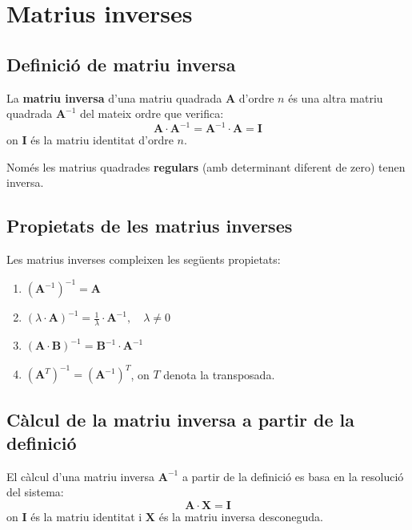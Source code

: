 \documentclass[12pt]{article}
\newcommand{\mat}[1]{\mathbf{#1}}
\begin{document}
\newpage

\section{Matrius inverses}

\subsection{Definició de matriu inversa}
\begin{concept}
La \textbf{matriu inversa} d'una matriu quadrada $\mat{A}$ d'ordre $n$ és una altra matriu quadrada $\mat{A}^{-1}$ del mateix ordre que verifica:
\[
\mat{A} \cdot \mat{A}^{-1} = \mat{A}^{-1} \cdot \mat{A} = \mat{I}
\]
on $\mat{I}$ és la matriu identitat d'ordre $n$.

Només les matrius quadrades \textbf{regulars} (amb determinant diferent de zero) tenen inversa.
\end{concept}

\subsection{Propietats de les matrius inverses}
\begin{concept}
Les matrius inverses compleixen les següents propietats:
\begin{enumerate}
    \item $(\mat{A}^{-1})^{-1} = \mat{A}$
    \item $(\lambda \cdot \mat{A})^{-1} = \frac{1}{\lambda} \cdot \mat{A}^{-1}, \quad \lambda \neq 0$
    \item $(\mat{A} \cdot \mat{B})^{-1} = \mat{B}^{-1} \cdot \mat{A}^{-1}$
    \item $(\mat{A}^T)^{-1} = (\mat{A}^{-1})^T$, on $T$ denota la transposada.
\end{enumerate}
\end{concept}

\subsection{Càlcul de la matriu inversa a partir de la definició}
\begin{concept}
El càlcul d'una matriu inversa $\mat{A}^{-1}$ a partir de la definició es basa en la resolució del sistema:
\[
\mat{A} \cdot \mat{X} = \mat{I}
\]
on $\mat{I}$ és la matriu identitat i $\mat{X}$ és la matriu inversa desconeguda.
\end{concept}
\end{document}
